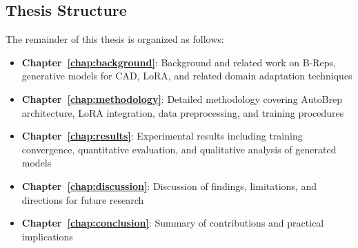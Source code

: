 \subsection{Thesis Structure}

The remainder of this thesis is organized as follows:

\begin{itemize}
    \item \textbf{Chapter~\ref{chap:background}}: Background and related work on B-Reps, generative models for CAD, LoRA, and related domain adaptation techniques

    \item \textbf{Chapter~\ref{chap:methodology}}: Detailed methodology covering AutoBrep architecture, LoRA integration, data preprocessing, and training procedures

    \item \textbf{Chapter~\ref{chap:results}}: Experimental results including training convergence, quantitative evaluation, and qualitative analysis of generated models

    \item \textbf{Chapter~\ref{chap:discussion}}: Discussion of findings, limitations, and directions for future research

    \item \textbf{Chapter~\ref{chap:conclusion}}: Summary of contributions and practical implications
\end{itemize}
